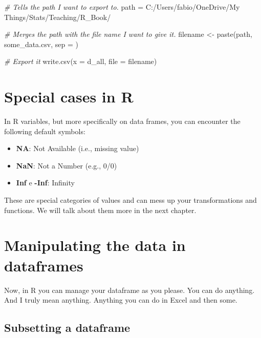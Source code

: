 \documentclass[
]{book}
\newenvironment{Shaded}{\begin{snugshade}}{\end{snugshade}}
\newcommand{\AttributeTok}[1]{\textcolor[rgb]{0.77,0.63,0.00}{#1}}
\newcommand{\CommentTok}[1]{\textcolor[rgb]{0.56,0.35,0.01}{\textit{#1}}}
\newcommand{\FunctionTok}[1]{\textcolor[rgb]{0.00,0.00,0.00}{#1}}
\newcommand{\NormalTok}[1]{#1}
\newcommand{\OtherTok}[1]{\textcolor[rgb]{0.56,0.35,0.01}{#1}}
\newcommand{\StringTok}[1]{\textcolor[rgb]{0.31,0.60,0.02}{#1}}
\begin{document}
\begin{Shaded}
\begin{Highlighting}[]
\CommentTok{\# Tells the path I want to export to.}
\NormalTok{path }\OtherTok{=} \StringTok{\textquotesingle{}C:/Users/fabio/OneDrive/My Things/Stats/Teaching/R\_Book/\textquotesingle{}}

\CommentTok{\# Merges the path with the file name I want to give it.}
\NormalTok{filename }\OtherTok{\textless{}{-}} \FunctionTok{paste}\NormalTok{(path, }\StringTok{\textquotesingle{}some\_data.csv\textquotesingle{}}\NormalTok{, }\AttributeTok{sep =} \StringTok{\textquotesingle{}\textquotesingle{}}\NormalTok{)}

\CommentTok{\# Export it}
\FunctionTok{write.csv}\NormalTok{(}\AttributeTok{x =}\NormalTok{ d\_all, }\AttributeTok{file =}\NormalTok{ filename)}
\end{Highlighting}
\end{Shaded}

\hypertarget{special-cases-in-r}{%
\section{Special cases in R}\label{special-cases-in-r}}

In R variables, but more specifically on data frames, you can encounter the following default symbols:

\begin{itemize}
\item
  \textbf{NA}: Not Available (i.e., missing value)
\item
  \textbf{NaN}: Not a Number (e.g., 0/0)
\item
  \textbf{Inf} e \textbf{-Inf}: Infinity
\end{itemize}

These are special categories of values and can mess up your transformations and functions.
We will talk about them more in the next chapter.

\hypertarget{manipulating-the-data-in-dataframes}{%
\section{Manipulating the data in dataframes}\label{manipulating-the-data-in-dataframes}}

Now, in R you can manage your dataframe as you please.
You can do anything.
And I truly mean anything.
Anything you can do in Excel and then some.

\hypertarget{subsetting-a-dataframe}{%
\subsection{Subsetting a dataframe}\label{subsetting-a-dataframe}}
\end{document}

